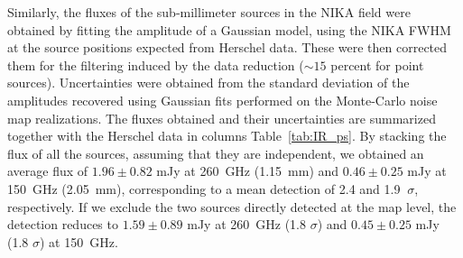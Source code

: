 \documentclass[twocolumn,traditabstract]{aa}
\begin{document}
Similarly, the fluxes of the sub-millimeter sources in the NIKA field were obtained by fitting the amplitude of a Gaussian model, using the NIKA FWHM at the source positions expected from Herschel data. These were then corrected them for the filtering induced by the data reduction ($\sim15$ percent for point sources). Uncertainties were obtained from the standard deviation of the amplitudes recovered using Gaussian fits performed on the Monte-Carlo noise map realizations. The fluxes obtained and their uncertainties are summarized together with the Herschel data in columns Table~\ref{tab:IR_ps}. By stacking the flux of all the sources, assuming that they are independent, we obtained an average flux of $1.96 \pm 0.82$ mJy at 260~GHz (1.15~mm) and $0.46 \pm 0.25$ mJy at 150~GHz (2.05~mm), corresponding to a mean detection of 2.4 and 1.9 $ \ \sigma$, respectively. If we exclude the two sources directly detected at the map level, the detection reduces to $1.59 \pm 0.89$ mJy at 260~GHz (1.8 $\sigma$) and $0.45 \pm 0.25$ mJy (1.8 $\sigma$) at 150~GHz.
\end{document}
